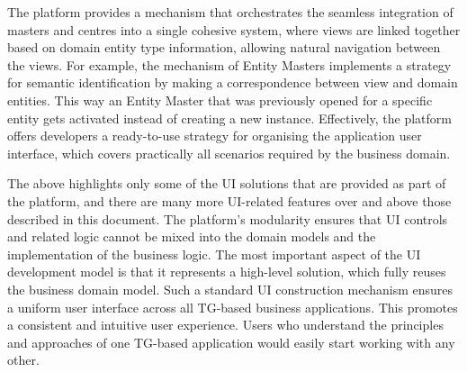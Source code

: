   The platform provides a mechanism that orchestrates the seamless integration of masters and centres into a single cohesive system, where views are linked together based on domain entity type information, allowing natural navigation between the views.
  For example, the mechanism of Entity Masters implements a strategy for semantic identification by making a correspondence between view and domain entities.
  This way an Entity Master that was previously opened for a specific entity gets activated instead of creating a new instance.
  Effectively, the platform offers developers a ready-to-use strategy for organising the application user interface, which covers practically all scenarios required by the business domain.

  The above highlights only some of the UI solutions that are provided as part of the platform, and there are many more UI-related features over and above those described in this document.
  The platform's modularity ensures that UI controls and related logic cannot be mixed into the domain models and the implementation of the business logic.
  The most important aspect of the UI development model is that it represents a high-level solution, which fully reuses the business domain model.
  Such a standard UI construction mechanism ensures a uniform user interface across all TG-based business applications.
  This promotes a consistent and intuitive user experience.
  Users who understand the principles and approaches of one TG-based application would easily start working with any other.